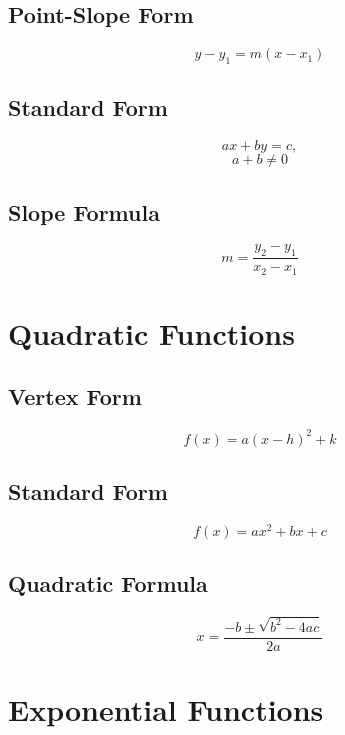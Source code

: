 \documentclass{book}
\begin{document}
\subsection{Point-Slope Form}
\begin{equation}
    y-y_1 = m(x - x_1)
\end{equation}
\subsection{Standard Form}
\begin{equation}
    ax+by = c,
\end{equation}
\begin{equation}
    a+b \neq 0 
\end{equation}
\subsection{Slope Formula}
\begin{equation}
    m = \frac{y_2 - y_1}{x_2 - x_1}
\end{equation}

\section{Quadratic Functions}
\subsection{Vertex Form}
\begin{equation}
    f(x) = a(x-h)^2 + k
\end{equation}

\subsection{Standard Form}
\begin{equation}
    f(x) = ax^2 + bx + c
\end{equation}

\subsection{Quadratic Formula}
\begin{equation}
	x = \frac{-b \pm \sqrt{b^2 - 4ac}}{2a}
\end{equation}

\section{Exponential Functions}
\end{document}
